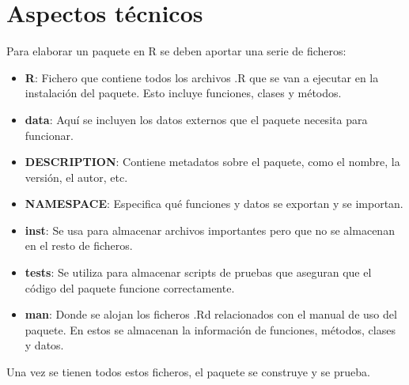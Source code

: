 \section{Aspectos técnicos}
\label{sec:org20b66d5}
Para elaborar un paquete en R se deben aportar una serie de ficheros:
\begin{itemize}
\item \textbf{R}: Fichero que contiene todos los archivos .R que se van a ejecutar en la instalación del paquete. Esto incluye funciones, clases y métodos.
\item \textbf{data}: Aquí se incluyen los datos externos que el paquete necesita para funcionar.
\item \textbf{DESCRIPTION}: Contiene metadatos sobre el paquete, como el nombre, la versión, el autor, etc.
\item \textbf{NAMESPACE}: Especifica qué funciones y datos se exportan y se importan.
\item \textbf{inst}: Se usa para almacenar archivos importantes pero que no se almacenan en el resto de ficheros.
\item \textbf{tests}: Se utiliza para almacenar scripts de pruebas que aseguran que el código del paquete funcione correctamente.
\item \textbf{man}: Donde se alojan los ficheros .Rd relacionados con el manual de uso del paquete. En estos se almacenan la información de funciones, métodos, clases y datos.
\end{itemize}

Una vez se tienen todos estos ficheros, el paquete se construye y se prueba.
